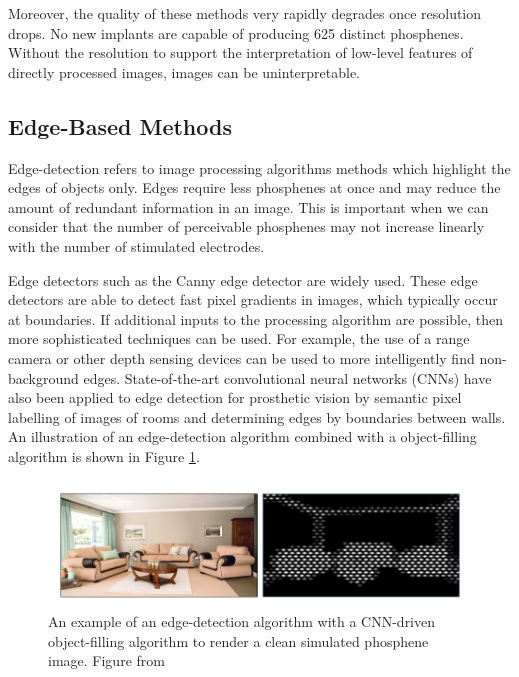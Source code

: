 \documentclass[a4paper,11pt,openany]{book}
\begin{document}
Moreover, the quality of these methods very rapidly degrades once resolution drops. \cite{li_image_2018}
No new implants are capable of producing 625 distinct phosphenes. \cite{lewis_restoration_2015}
Without the resolution to support the interpretation of low-level features of directly processed images, images can be uninterpretable.

\subsection*{Edge-Based Methods}
\label{sec:orgd291ca3}

Edge-detection refers to image processing algorithms methods which highlight the edges of objects only. \cite{canny_readings_1987}
Edges require less phosphenes at once and may reduce the amount of redundant information in an image.
This is important when we can consider that the number of perceivable phosphenes may not increase linearly with the number of stimulated electrodes. \cite{bosking_rules_2018}

Edge detectors such as the Canny \cite{canny_readings_1987} edge detector are widely used.
These edge detectors are able to detect fast pixel gradients in images, which typically occur at boundaries.
If additional inputs to the processing algorithm are possible, then more sophisticated techniques can be used.
For example, the use of a range camera or other depth sensing devices can be used to more intelligently find non-background edges. \cite{lui_transformative_2012}
State-of-the-art convolutional neural networks (CNNs) have also been applied to edge detection for prosthetic vision by semantic pixel labelling of images of rooms and determining edges by boundaries between walls. \cite{sanchez-garcia_structural_2018}
An illustration of an edge-detection algorithm combined with a object-filling algorithm is shown in Figure \ref{fig:orgfa3d114}.

\begin{figure}[htbp]
\centering
\includegraphics[width=.9\linewidth]{./graphics/litreview/edgeandfill.png}
\caption{\label{fig:orgfa3d114}
An example of an edge-detection algorithm with a CNN-driven object-filling algorithm to render a clean simulated phosphene image. Figure from \cite{sanchez-garcia_structural_2018}}
\end{figure}
\end{document}
